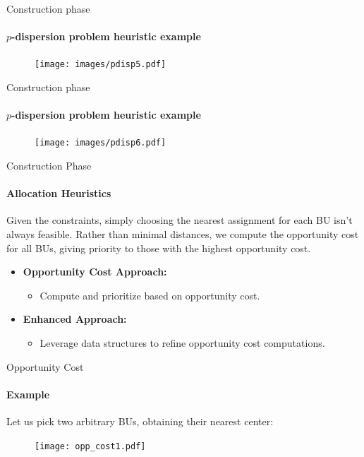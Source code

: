 \documentclass{beamer}
\begin{document}
\begin{frame}{Construction phase}
    \framesubtitle{$p$-dispersion problem heuristic example}
    \begin{figure}
        \centering
        \texttt{[image: images/pdisp5.pdf]}
    \end{figure}
\end{frame}
\begin{frame}{Construction phase}
    \framesubtitle{$p$-dispersion problem heuristic example}
    \begin{figure}
        \centering
        \texttt{[image: images/pdisp6.pdf]}
    \end{figure}
\end{frame}


\begin{frame}{Construction Phase}
    \framesubtitle{Allocation Heuristics}
    Given the constraints, simply choosing the nearest assignment for each BU isn't always feasible. Rather than minimal distances, we compute the opportunity cost for all BUs, giving priority to those with the highest opportunity cost.
    \begin{itemize}
        \item \textbf{Opportunity Cost Approach:}
        \begin{itemize}
            \item Compute and prioritize based on opportunity cost.
        \end{itemize}
        
        \item \textbf{Enhanced Approach:}
        \begin{itemize}
            \item Leverage data structures to refine opportunity cost computations.
        \end{itemize}
    \end{itemize}
\end{frame}

\begin{frame}{Opportunity Cost}
    \framesubtitle{Example}
    Let us pick two arbitrary BUs, obtaining their nearest center:
    \begin{figure}
        \centering
        \texttt{[image: opp\_cost1.pdf]}
    \end{figure}
\end{frame}
\end{document}
